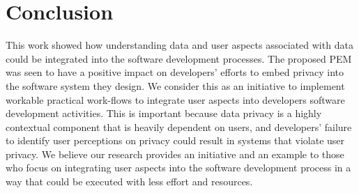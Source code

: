 \documentclass{sigchi}
\begin{document}
\section {Conclusion}

This work showed how understanding data and user aspects associated with data could be integrated into the software development processes. The proposed PEM was seen to have a positive impact on developers' efforts to embed privacy into the software system they design. We consider this as an initiative to implement workable practical work-flows to integrate user aspects into developers software development activities. This is important because data privacy is a highly contextual component that is heavily dependent on users, and developers' failure to identify user perceptions on privacy could result in systems that violate user privacy. We believe our research provides an initiative and an example to those who focus on integrating user aspects into the software development process in a way that could be executed with less effort and resources. 




\balance{}



\end{document}
